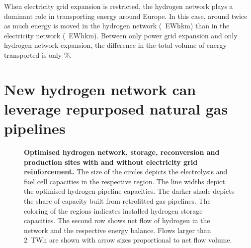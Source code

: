 When electricity grid expansion is restricted, the hydrogen network plays a
dominant role in transporting energy around Europe. In this case, around twice
as much energy is moved in the hydrogen network (\ewhkmhydrogen~EWhkm) than in
the electricity network (\ewhkmelectricity~EWhkm). Between only power grid
expansion and only hydrogen network expansion, the difference in the total
volume of energy transported is only \ewhkmdiff\%.

\section*{New hydrogen network can leverage repurposed natural gas pipelines}
\label{sec:repurposed}

\begin{figure}
    \centering
      \caption{ \textbf{Optimised hydrogen network, storage, reconversion and production
    sites with and without electricity grid reinforcement.} The size of the
    circles depicts the electrolysis and fuel cell capacities in the respective
    region. The line widths depict the optimised hydrogen pipeline capacities.
    The darker shade depicts the share of capacity built from retrofitted gas
    pipelines. The coloring of the regions indicates installed hydrogen storage
    capacities. The second row shows net flow of hydrogen in the network and the
    respective energy balance. Flows larger than 2~TWh are shown with arrow
    sizes proportional to net flow volume.}
    \label{fig:h2-network}
\end{figure}

